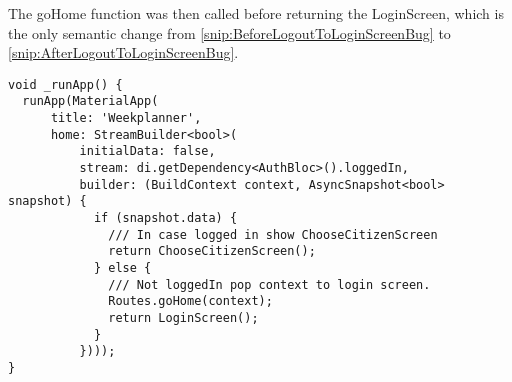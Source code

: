 The goHome function was then called before returning the LoginScreen, which is the only semantic change from \autoref{snip:BeforeLogoutToLoginScreenBug} to \autoref{snip:AfterLogoutToLoginScreenBug}. 

\begin{lstlisting}[label={snip:AfterLogoutToLoginScreenBug}, caption={The \_runApp function after the bug fix(notice the call to the goHome function)}, captionpos=b, language=CSharp] 
void _runApp() {
  runApp(MaterialApp(
      title: 'Weekplanner',
      home: StreamBuilder<bool>(
          initialData: false,
          stream: di.getDependency<AuthBloc>().loggedIn,
          builder: (BuildContext context, AsyncSnapshot<bool> snapshot) {
            if (snapshot.data) {
              /// In case logged in show ChooseCitizenScreen
              return ChooseCitizenScreen();
            } else {
              /// Not loggedIn pop context to login screen.
              Routes.goHome(context);
              return LoginScreen();
            }
          })));
}
\end{lstlisting}
